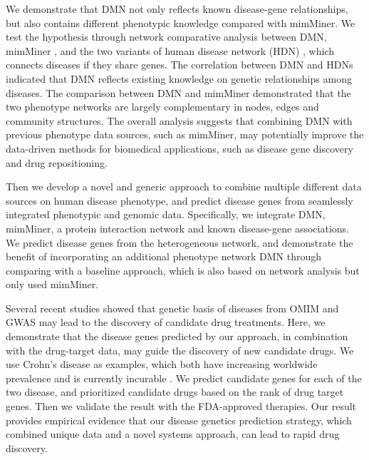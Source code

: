 We demonstrate that DMN
not only reflects known disease-gene relationships, but also contains different phenotypic knowledge compared with mimMiner.
We test the hypothesis through network comparative analysis between DMN, mimMiner \cite{van2006text},
and the two variants of human disease network (HDN) \cite{goh2007human}, which connects diseases if they share genes.
The correlation between DMN and HDNs indicated that DMN reflects existing knowledge on genetic relationships among diseases.
The comparison between DMN and mimMiner demonstrated that the two phenotype networks are largely complementary in nodes, edges and community structures.
The overall analysis suggests that combining DMN with previous phenotype data sources, such as mimMiner,
may potentially improve the data-driven  methods for biomedical applications, such as disease gene discovery and drug repositioning.



Then we develop a novel and generic
approach to combine multiple
different data sources on human disease phenotype, and predict
disease genes from seamlessly integrated phenotypic and genomic data.
Specifically, we integrate DMN, mimMiner,
a protein interaction network and known disease-gene associations.
We predict disease genes from the heterogeneous network,
and demonstrate the benefit of incorporating an additional
phenotype network DMN through comparing with a baseline approach,
which is also based on network analysis but only used mimMiner.

Several recent studies showed
that genetic basis of diseases from OMIM \cite{wang2013rational} and GWAS \cite{sanseau2012use}
may lead to the discovery of candidate drug treatments.
Here, we demonstrate
that the disease genes predicted by our approach,
in combination with the drug-target data, may
guide the discovery of new candidate drugs.
We use Crohn's disease as examples,
which both have increasing worldwide prevalence \cite{molodecky2012increasing}
and is currently incurable \cite{atreya2014vivo,cosnes2011epidemiology}.
We predict candidate genes for each of the two disease, and
prioritized candidate drugs based on the rank of drug target genes.
Then we validate the result with the FDA-approved therapies.
Our result provides empirical evidence that our disease genetics prediction strategy,
which combined unique data and a novel systems approach,
can lead to rapid drug discovery.







